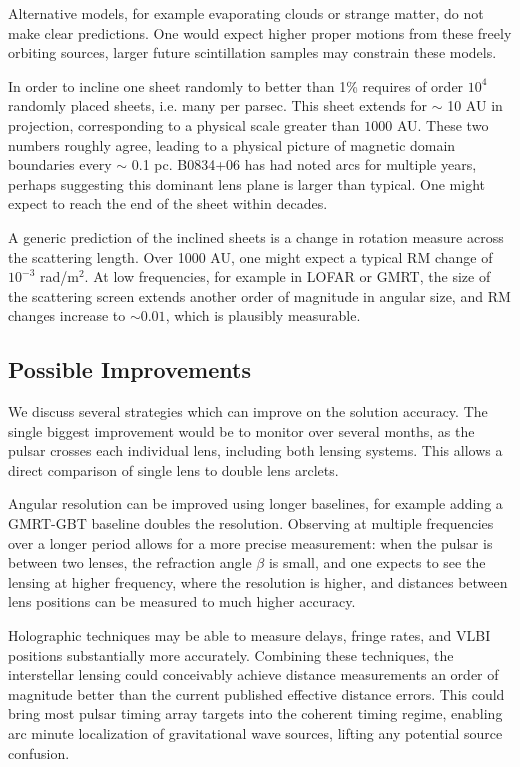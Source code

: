 \documentclass[useAMS,usenatbib]{mn2e}
\begin{document}
Alternative models, for example evaporating
clouds\citep{1998ApJ...498L.125W} or strange
matter\citep{2013PhLB..727..357P}, do not make clear predictions.  One
would expect higher proper motions from these freely orbiting sources,
larger future scintillation samples may constrain these models.

In order to incline one sheet randomly to better than 1\% requires of
order $10^4$ randomly placed sheets, i.e. many per parsec.  This sheet
extends for $\sim$ 10 AU in projection, corresponding to a physical
scale greater than $1000$ AU.   These two numbers roughly agree,
leading to a physical picture of magnetic domain boundaries every
$\sim$ 0.1 pc.  B0834+06 has had noted arcs for multiple years,
perhaps suggesting this dominant lens plane is larger than typical.
One might expect to reach the end of the sheet within decades.

A generic prediction of the inclined sheets is a change in rotation
measure across the scattering length.  Over 1000 AU, one might expect
a typical RM change of $10^{-3}$ rad/m$^2$.  At low frequencies, for
example in LOFAR or GMRT, the size of the scattering screen extends
another order of magnitude in angular size, and RM changes increase to
$\sim 0.01$, which is plausibly measurable.

\subsection{Possible Improvements}

We discuss several strategies which can improve on the solution
accuracy.  The single biggest improvement would be to monitor over
several months, as the pulsar crosses each individual lens,
including both lensing systems.  This allows a direct comparison of
single lens to double lens arclets.

Angular resolution can be improved using longer baselines, for example
adding a GMRT-GBT baseline doubles the resolution.  Observing at
multiple frequencies over a longer period allows for a more precise
measurement: when the pulsar is between two lenses, the refraction
angle $\beta$ is small, and one expects to see the lensing at higher
frequency, where the resolution is higher, and distances between
lens positions can be measured to much higher accuracy.

Holographic techniques \citep{2008MNRAS.388.1214W,2014MNRAS.440L..36P}
may be able to measure delays, fringe rates, and VLBI positions
substantially more accurately.  Combining these techniques, the
interstellar lensing could conceivably achieve distance measurements
an order of magnitude better than the current published effective
distance errors.  This could bring most pulsar timing array targets
into the coherent timing regime, enabling arc minute localization of
gravitational wave sources, lifting any potential source confusion.
\end{document}
